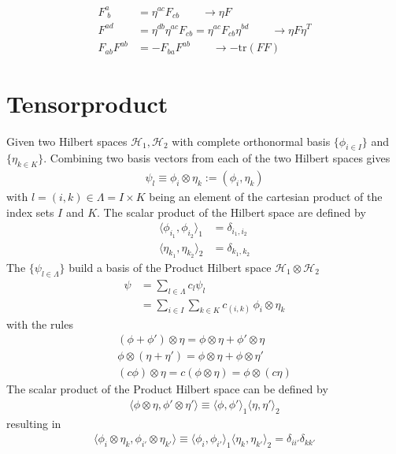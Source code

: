 \documentclass[10pt,a4paper]{book}
\theoremstyle{definition}
\begin{document}
\begin{align}
F^a_{\;b}&=\eta^{ac}F_{cb}\qquad\rightarrow \eta F\\
F^{ad}&=\eta^{db}\eta^{ac}F_{cb}=\eta^{ac}F_{cb}\eta^{bd}\qquad\rightarrow \eta F\eta^T\\
F_{ab}F^{ab}&=-F_{ba}F^{ab}\qquad\rightarrow-\text{tr}(F F)
\end{align}


\section{Tensorproduct}
Given two Hilbert spaces $\mathcal{H}_1, \mathcal{H}_2$ with complete orthonormal basis $\{\phi_{i\in I}\}$ and $\{\eta_{k\in K}\}$. 
Combining two basis vectors from each of the two Hilbert spaces 
gives
\begin{align}
\psi_l\equiv\phi_i\otimes\eta_k:=(\phi_i,\eta_k)
\end{align}
with $l=(i,k)\in\Lambda=I\times K$ being an element of the cartesian product of the index sets $I$ and $K$. 
The scalar product of the Hilbert space are defined by
\begin{align}
\langle\phi_{i_1},\phi_{i_2}\rangle_1&=\delta_{i_1,i_2}\\
\langle\eta_{k_1},\eta_{k_2}\rangle_2&=\delta_{k_1,k_2}
\end{align}
The $\{\psi_{l\in\Lambda}\}$ build a basis of the Product Hilbert space $\mathcal{H}_1\otimes\mathcal{H}_2$
\begin{align}
\psi&=\sum_{l\in\Lambda}c_l\psi_l\\
&=\sum_{i\in I}\sum_{k\in K}c_{(i,k)}\,\phi_i\otimes\eta_k
\end{align}
with the rules
\begin{align}
(\phi+\phi')\otimes\eta=\phi\otimes\eta+\phi'\otimes\eta\\
\phi\otimes(\eta+\eta')=\phi\otimes\eta+\phi\otimes\eta'\\
(c\phi)\otimes\eta=c(\phi\otimes\eta)=\phi\otimes(c\eta)
\end{align}
The scalar product of the Product Hilbert space can be defined by
\begin{align}
\langle\phi\otimes\eta,\phi'\otimes\eta'\rangle\equiv
\langle\phi,\phi'\rangle_1\langle\eta,\eta'\rangle_2
\end{align}
resulting in
\begin{align}
\langle\phi_i\otimes\eta_k,\phi_{i'}\otimes\eta_{k'}\rangle\equiv
\langle\phi_i,\phi_{i'}\rangle_1\langle\eta_k,\eta_{k'}\rangle_2=\delta_{ii'}\delta_{kk'}
\end{align}
\end{document}
